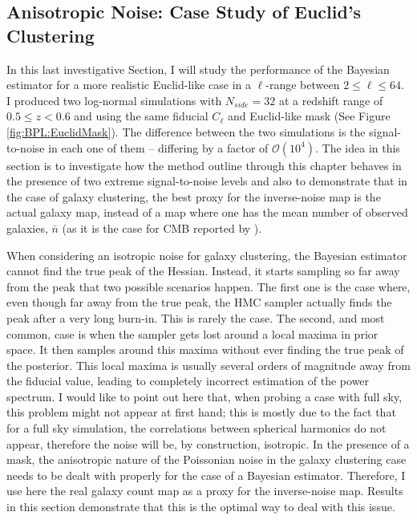 \subsection{Anisotropic Noise: Case Study of Euclid's Clustering}\label{Sec:Noise}
In this last investigative Section, I will study the performance of the Bayesian estimator for a more realistic Euclid-like case in a $\ell$-range between $2 \leq \ell \leq 64$. I produced two log-normal simulations with $N_{side}=32$ at a redshift range of $0.5 \leq z < 0.6$ and using the same fiducial $C_{\ell}$ and Euclid-like mask (See Figure \ref{fig:BPL:EuclidMask}). The difference between the two simulations is the signal-to-noise in each one of them -- differing by a factor of $\mathcal{O}(10^4)$. The idea in this section is to investigate how the method outline through this chapter behaves in the presence of two extreme signal-to-noise levels and also to demonstrate that in the case of galaxy clustering, the best proxy for the inverse-noise map is the actual galaxy map, instead of a map where one has the mean number of observed galaxies, $\bar{n}$ (as it is the case for CMB reported by \cite{SreeThesis}). 

\qquad When considering an isotropic noise for galaxy clustering, the Bayesian estimator cannot find the true peak of the Hessian. Instead, it starts sampling so far away from the peak that two possible scenarios happen. The first one is the case where, even though far away from the true peak, the HMC sampler actually finds the peak after a very long burn-in. This is rarely the case. The second, and most common, case is when the sampler gets lost around a local maxima in prior space. It then samples around this maxima without ever finding the true peak of the posterior. This local maxima is usually several orders of magnitude away from the fiducial value, leading to completely incorrect estimation of the power spectrum. I would like to point out here that, when probing a case with full sky, this problem might not appear at first hand; this is mostly due to the fact that for a full sky simulation, the correlations between spherical harmonics do not appear, therefore the noise will be, by construction, isotropic. In the presence of a mask, the anisotropic nature of the Poissonian noise in the galaxy clustering case needs to be dealt with properly for the case of a Bayesian estimator. Therefore, I use here the real galaxy count map as a proxy for the inverse-noise map. Results in this section demonstrate that this is the optimal way to deal with this issue.

